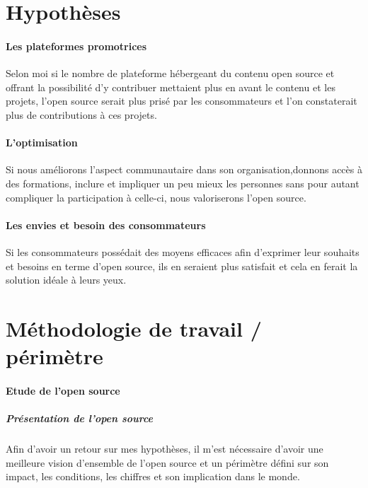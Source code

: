 	\section{Hypothèses}

		\paragraph{Les plateformes promotrices\\}

		Selon moi si le nombre de plateforme hébergeant du contenu open source et offrant la possibilité d'y contribuer mettaient plus en avant le contenu et les projets, l'open source serait plus prisé par les consommateurs et l'on constaterait plus de contributions à ces projets.

		\paragraph{L'optimisation\\}

		Si nous améliorons l'aspect communautaire dans son organisation,donnons accès à des formations, inclure et impliquer un peu mieux les personnes sans pour autant compliquer la participation à celle-ci, nous valoriserons l'open source.

		\paragraph{Les envies et besoin des consommateurs\\}

		Si les consommateurs possédait des moyens efficaces afin d'exprimer leur souhaits et besoins en terme d'open source, ils en seraient plus satisfait et cela en ferait la solution idéale à leurs yeux.

	\section{Méthodologie de travail / périmètre}
		\paragraph{Etude de l'open source}
		\subparagraph{Présentation de l'open source\\}

		Afin d'avoir un retour sur mes hypothèses, il m'est nécessaire d'avoir une meilleure vision d'ensemble de l'open source et un périmètre défini sur son impact, les conditions, les chiffres et son implication dans le monde.

